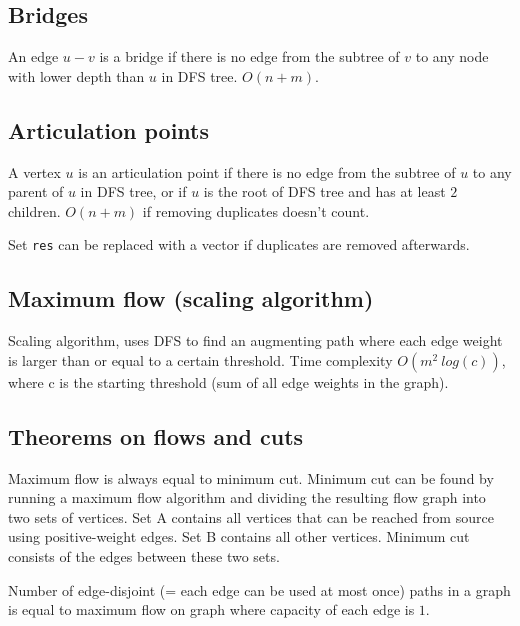 \documentclass{article}
\begin{document}
\subsection {Bridges}

An edge $u-v$ is a bridge if there is no edge from the subtree of $v$ to any node with lower depth than $u$ in DFS tree. $O(n+m)$.



\subsection {Articulation points}

A vertex $u$ is an articulation point if there is no edge from the subtree of $u$ to any parent of $u$ in DFS tree, or if $u$ is the root of DFS tree and has at least $2$ children. $O(n+m)$ if removing duplicates doesn't count.

Set \texttt{res} can be replaced with a vector if duplicates are removed afterwards.



\subsection {Maximum flow (scaling algorithm)}

Scaling algorithm, uses DFS to find an augmenting path where each edge weight is larger than or equal to a certain threshold. Time complexity $O(m^2 \ log(c))$, where c is the starting threshold (sum of all edge weights in the graph).



\subsection {Theorems on flows and cuts}

Maximum flow is always equal to minimum cut. Minimum cut can be found by running a maximum flow algorithm and dividing the resulting flow graph into two sets of vertices. Set A contains all vertices that can be reached from source using positive-weight edges. Set B contains all other vertices. Minimum cut consists of the edges between these two sets.

Number of edge-disjoint (= each edge can be used at most once) paths in a graph is equal to maximum flow on graph where capacity of each edge is $1$.
\end{document}
